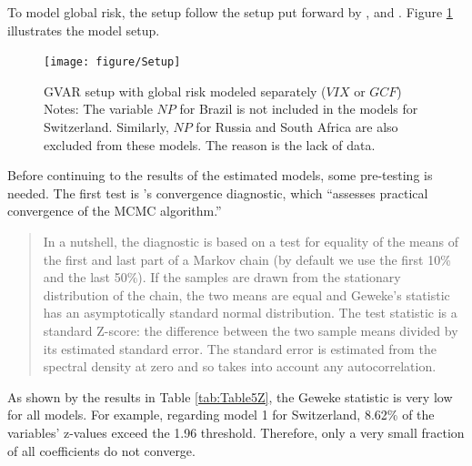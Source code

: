 \documentclass[a4paper, twoside]{templates/ociamthesis}
\begin{document}
To model global risk, the setup follow the setup put forward by \textcite{georgiadis2015}, \textcite{mohaddes2019} and \textcite{feldkircher2020}. Figure \ref{fig:Figure510} illustrates the model setup.

\begin{figure}[!ht]

{\centering \texttt{[image: figure/Setup]} 

}

\caption[GVAR setup with global risk modeled separately ($VIX$ or $GCF$)]{GVAR setup with global risk modeled separately ($VIX$ or $GCF$) \newline \scriptsize Notes: The variable $NP$ for Brazil is not included in the models for Switzerland. Similarly, $NP$ for Russia and South Africa are also excluded from these models. The reason is the lack of data.}\label{fig:Figure510}
\end{figure}

Before continuing to the results of the estimated models, some pre-testing is needed. The first test is \textcite{geweke1992}'s convergence diagnostic, which ``assesses practical convergence of the MCMC algorithm.'' \autocite[ 11]{bock2020}

\begin{quote}
In a nutshell, the diagnostic is based on a test for equality of the means of the first and last part of a Markov chain (by default we use the first 10\% and the last 50\%). If the samples are drawn from the stationary distribution of the chain, the two means are equal and Geweke's statistic has an asymptotically standard normal distribution. The test statistic is a standard Z-score: the difference between the two sample means divided by its estimated standard error. The standard error is estimated from the spectral density at zero and so takes into account any autocorrelation. \autocite[ 11]{bock2020}
\end{quote}

As shown by the results in Table \ref{tab:Table5Z}, the Geweke statistic is very low for all models. For example, regarding model 1 for Switzerland, 8.62\% of the variables' z-values exceed the 1.96 threshold. Therefore, only a very small fraction of all coefficients do not converge.

\begin{table}[!ht]

\caption{\label{tab:Table5Z}Convergence diagnostics, Geweke statistic}
\centering
{}
\end{table}
\end{document}
